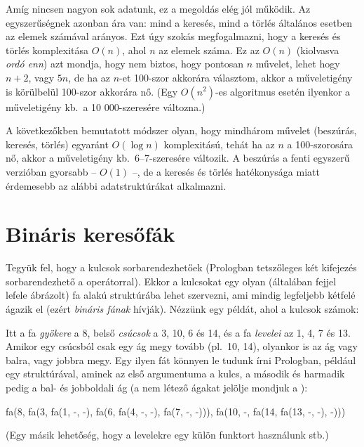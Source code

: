 Amíg nincsen nagyon sok adatunk, ez a megoldás elég
jól működik. Az egyszerűségnek azonban ára van: mind
a keresés, mind a törlés általános esetben az elemek
számával arányos. Ezt úgy szokás megfogalmazni, hogy
a keresés és törlés komplexitása $O(n)$, ahol $n$ az
elemek száma. Ez az $O(n)$ (kiolvasva \emph{ordó
enn}) azt mondja, hogy nem biztos, hogy pontosan $n$
művelet, lehet hogy $n+2$, vagy $5n$, de ha az
$n$-et 100-szor akkorára választom, akkor a
műveletigény is körülbelül 100-szor akkorára
nő. (Egy $O(n^2)$-es algoritmus esetén ilyenkor a
műveletigény kb.~a 10 000-szeresére változna.)

A következőkben bemutatott módszer olyan, hogy
mindhárom művelet (beszúrás, keresés, törlés)
egyaránt $O(\log n)$ komplexitású, tehát ha az $n$ a
100-szorosára nő, akkor a műveletigény
kb.~6--7-szeresére változik. A beszúrás a fenti
egyszerű verzióban gyorsabb -- $O(1)$ --, de a
keresés és törlés hatékonysága miatt érdemesebb az
alábbi adatstruktúrákat alkalmazni.

\section{Bináris keresőfák}
Tegyük fel, hogy a kulcsok sorbarendezhetőek
(Prologban tetszőleges két kifejezés sorbarendezhető
a  operátorral). Ekkor a kulcsokat egy olyan
(általában fejjel lefele ábrázolt) fa alakú
struktúrába lehet szervezni, ami mindig legfeljebb
kétfelé ágazik el (ezért \emph{bináris fának}
hívják). Nézzünk egy példát, ahol a kulcsok számok:

\begin{center}
\end{center}
Itt a fa \emph{gyökere} a 8, belső \emph{csúcsok} a
3, 10, 6 és 14, és a fa \emph{levelei} az 1, 4, 7 és
13. Amikor egy csúcsból csak egy ág megy tovább
(pl.~10, 14), olyankor is az ág vagy balra, vagy
jobbra megy. Egy ilyen fát könnyen le tudunk írni
Prologban, például egy  struktúrával, aminek
az első argumentuma a kulcs, a második és harmadik
pedig a bal- és jobboldali ág (a nem létező ágakat
jelölje mondjuk a \pr{-}):
\begin{program}
fa(8, fa(3, fa(1, -, -),
            fa(6, fa(4, -, -),
                  fa(7, -, -))),
      fa(10, -,
             fa(14, fa(13, -, -),
                    -)))
\end{program}
(Egy másik lehetőség, hogy a levelekre egy külön
 funktort használunk stb.)

